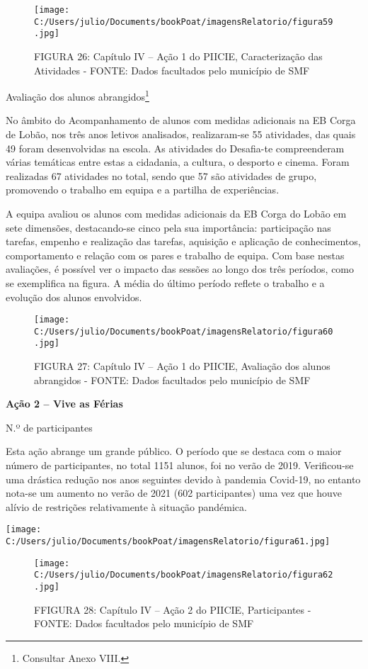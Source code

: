 \documentclass[
]{book}
\begin{document}
\begin{figure}
\centering
\texttt{[image: C:/Users/julio/Documents/bookPoat/imagensRelatorio/figura59.jpg]}
\caption{FIGURA 26: Capítulo IV -- Ação 1 do PIICIE, Caracterização das Atividades - FONTE: Dados facultados pelo município de SMF}
\end{figure}

Avaliação dos alunos abrangidos\footnote{Consultar Anexo VIII.}

No âmbito do Acompanhamento de alunos com medidas adicionais na EB Corga de Lobão, nos três anos letivos analisados, realizaram-se 55 atividades, das quais 49 foram desenvolvidas na escola. As atividades do Desafia-te compreenderam várias temáticas entre estas a cidadania, a cultura, o desporto e cinema. Foram realizadas 67 atividades no total, sendo que 57 são atividades de grupo, promovendo o trabalho em equipa e a partilha de experiências.

A equipa avaliou os alunos com medidas adicionais da EB Corga do Lobão em sete dimensões, destacando-se cinco pela sua importância: participação nas tarefas, empenho e realização das tarefas, aquisição e aplicação de conhecimentos, comportamento e relação com os pares e trabalho de equipa. Com base nestas avaliações, é possível ver o impacto das sessões ao longo dos três períodos, como se exemplifica na figura. A média do último período reflete o trabalho e a evolução dos alunos envolvidos.

\begin{figure}
\centering
\texttt{[image: C:/Users/julio/Documents/bookPoat/imagensRelatorio/figura60.jpg]}
\caption{FIGURA 27: Capítulo IV -- Ação 1 do PIICIE, Avaliação dos alunos abrangidos - FONTE: Dados facultados pelo município de SMF}
\end{figure}

\textbf{Ação 2 -- Vive as Férias}

N.º de participantes

Esta ação abrange um grande público. O período que se destaca com o maior número de participantes, no total 1151 alunos, foi no verão de 2019. Verificou-se uma drástica redução nos anos seguintes devido à pandemia Covid-19, no entanto nota-se um aumento no verão de 2021 (602 participantes) uma vez que houve alívio de restrições relativamente à situação pandémica.

\texttt{[image: C:/Users/julio/Documents/bookPoat/imagensRelatorio/figura61.jpg]}

\begin{figure}
\centering
\texttt{[image: C:/Users/julio/Documents/bookPoat/imagensRelatorio/figura62.jpg]}
\caption{FFIGURA 28: Capítulo IV -- Ação 2 do PIICIE, Participantes - FONTE: Dados facultados pelo município de SMF}
\end{figure}
\end{document}

